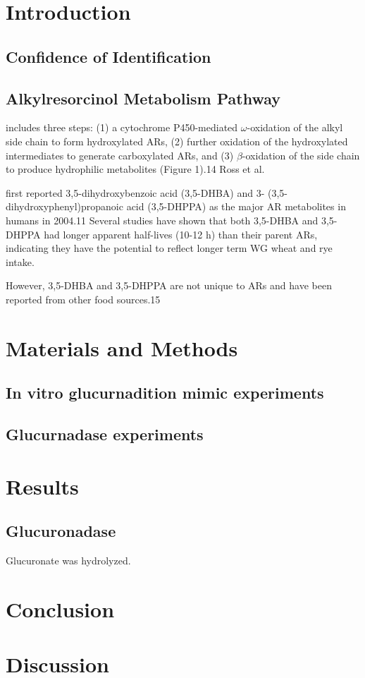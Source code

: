 \section{Introduction}
\subsection{Confidence of Identification}

\subsection{Alkylresorcinol Metabolism Pathway}
includes three steps: 
(1) a cytochrome P450-mediated $\omega$-oxidation of the alkyl side chain to form hydroxylated ARs, 
(2) further oxidation of the hydroxylated intermediates to generate carboxylated ARs, and 
(3) $\beta$-oxidation of the side chain to produce hydrophilic metabolites (Figure 1).14 Ross et al. 

first reported 3,5-dihydroxybenzoic acid (3,5-DHBA) and 3- (3,5-dihydroxyphenyl)propanoic acid (3,5-DHPPA) as the major AR metabolites in humans in 2004.11 Several studies have shown that both 3,5-DHBA and 3,5-DHPPA had longer apparent half-lives (10-12 h) than their parent ARs, indicating they have the potential to reflect longer term WG wheat and rye intake.

However, 3,5-DHBA and 3,5-DHPPA are not unique to ARs and have been reported from other food sources.15

\section{Materials and Methods}
	\subsection{In vitro glucurnadition mimic experiments}
	
	\subsection{Glucurnadase experiments}
	
	
	

\section{Results}
	\subsection{Glucuronadase}
	Glucuronate was hydrolyzed.
	

\section{Conclusion}


\section{Discussion}